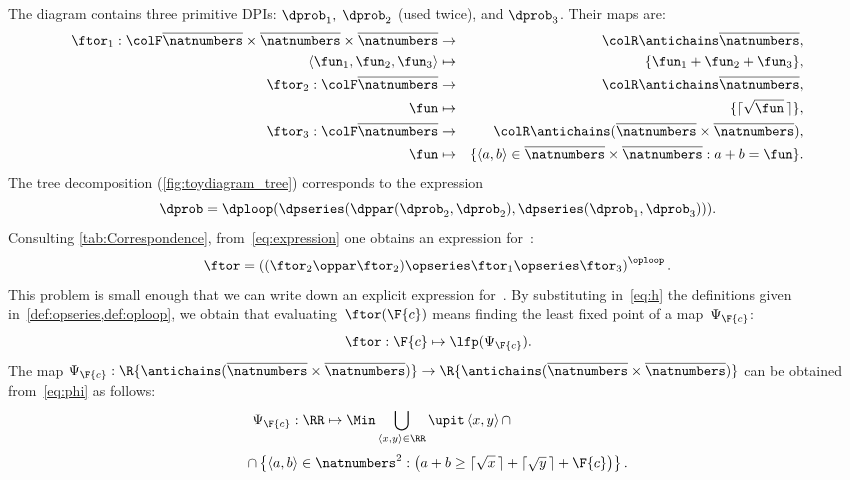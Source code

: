 The diagram contains three primitive DPIs: $\dprob_{1},$
$\dprob_{2}$ (used twice), and $\dprob_{3}$. Their \ftor maps
are:
\begin{eqnarray*}
  \ftor_{1}:{\colF\overline{\natnumbers}\times\overline{\natnumbers}\times\overline{\natnumbers}} & \rightarrow & {\colR\antichains\overline{\natnumbers}},\\
  \left\langle \fun_{1},\fun_{2},\fun_{3}\right\rangle  & \mapsto & \{\fun_{1}+\fun_{2}+\fun_{3}\},\\
  \ftor_{2}:{\colF\overline{\natnumbers}} & \rightarrow & {\colR\antichains\overline{\natnumbers}},\\
  \fun& \mapsto & \{\lceil\sqrt{\fun}\,\rceil\},\\
  \ftor_{3}:{\colF\overline{\natnumbers}} & \rightarrow & {\colR\antichains(\overline{\natnumbers}\times\overline{\natnumbers})},\\
  \fun& \mapsto & \{\left\langle a,b\right\rangle \in\overline{\natnumbers}\times\overline{\natnumbers}:a+b=\fun\}.
\end{eqnarray*}
The tree decomposition (\cref{fig:toydiagram_tree}) corresponds to
the expression
\begin{equation}
  \dprob=\dploop(\dpseries(\dppar(\dprob_{2},\dprob_{2}),\dpseries(\dprob_{1},\dprob_{3}))).\label{eq:expression}
\end{equation}
Consulting \cref{tab:Correspondence}, from~\cref{eq:expression}
one obtains an expression for~\ftor:
\begin{equation}
  \ftor=\left((\ftor_{2}\oppar\ftor_{2})\opseries\ftor_{1}\opseries\ftor_{3}\right)^{\oploop}.\label{eq:h}
\end{equation}
This problem is small enough that we can write down an explicit expression
for~\ftor. By substituting in~\cref{eq:h} the definitions given in~\cref{def:opseries,def:oploop}, we obtain that
evaluating~$\ftor(\F{c})$ means finding the least fixed point of a map~$\Psi_{\F{c}}$:
\[
  \ftor:\F{c}\mapsto\lfp(\Psi_{\F{c}}).
\]
The map $\Psi_{\F{c}}:\R{\antichains(\overline{\natnumbers}\times\overline{\natnumbers})}\rightarrow\R{\antichains(\overline{\natnumbers}\times\overline{\natnumbers})}$
can be obtained from~\cref{eq:phi} as follows:
\begin{equation}
  \Psi_{\F{c}}:\RR\mapsto\Min\bigcup_{\left\langle x,y\right\rangle \in\RR}\upit\left\langle x,y\right\rangle \cap\qquad\qquad\qquad\qquad
\end{equation}
\begin{equation}
  \cap\left\{ \left\langle a,b\right\rangle \in\natnumbers^{2}:\left(a+b\geq\lceil\sqrt{x}\,\rceil+\lceil\sqrt{y}\,\rceil+\F{c}\right)\right\}.
\end{equation}

